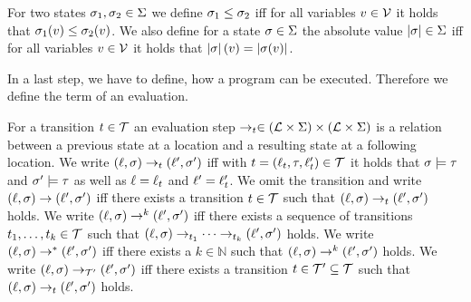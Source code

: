 For two states $\sigma_1, \sigma_2 \in \Sigma$ we define $\sigma_1 \leq \sigma_2$ iff for all variables $v \in \mathcal{V}$ it holds that $\sigma_1(v) \leq \sigma_2(v)$.
We also define for a state $\sigma \in \Sigma$ the absolute value $\left|\sigma\right| \in \Sigma$ iff for all variables $v \in \mathcal{V}$ it holds that $\left|\sigma\right|(v) = \left|\sigma(v)\right|$.

In a last step, we have to define, how a program can be executed.
Therefore we define the term of an evaluation.

\begin{definition}[Evaluation] 
  For a transition $t \in \mathcal{T}$ an evaluation step $\rightarrow_t \in (\mathcal{L} \times \Sigma) \times (\mathcal{L} \times \Sigma)$ is a relation between a previous state at a location and a resulting state at a following location.
  We write $(\ell, \sigma) \rightarrow_t (\ell', \sigma')$ iff with $t = (\ell_t, \tau, \ell_t') \in \mathcal{T}$ it holds that $\sigma \models \tau$ and $\sigma' \models \tau$ as well as $\ell = \ell_t$ and $\ell' = \ell_t'$.
  We omit the transition and write $(\ell, \sigma) \rightarrow (\ell', \sigma')$ iff there exists a transition $t \in \mathcal{T}$ such that $(\ell, \sigma) \rightarrow_t (\ell', \sigma')$ holds.
  We write $(\ell, \sigma) \rightarrow^k (\ell', \sigma')$ iff there exists a sequence of transitions $t_1, \dots, t_k \in \mathcal{T}$ such that $(\ell, \sigma) \rightarrow_{t_1} \dots \rightarrow_{t_k} (\ell', \sigma')$ holds.
  We write $(\ell, \sigma) \rightarrow^* (\ell', \sigma')$ iff there exists a $k \in \mathbb{N}$ such that $(\ell, \sigma) \rightarrow^k (\ell', \sigma')$ holds.
  We write $(\ell, \sigma) \rightarrow_{\mathcal{T}'} (\ell', \sigma')$ iff there exists a transition $t \in \mathcal{T}' \subseteq \mathcal{T}$ such that $(\ell, \sigma) \rightarrow_t (\ell', \sigma')$ holds.
\end{definition}
